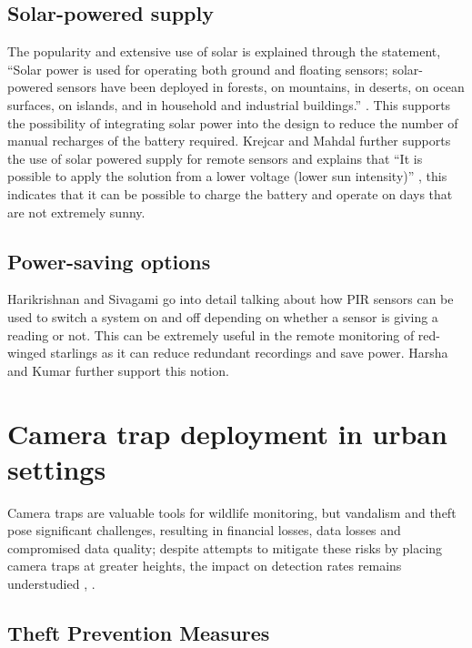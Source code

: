 \subsection{Solar-powered supply}

The popularity and extensive use of solar is explained through the statement, “Solar power is used for operating both ground and floating sensors; solar-powered sensors have been deployed in forests, on mountains, in deserts, on ocean surfaces, on islands, and in household and industrial buildings.” \cite{dewan2014alternative}. This supports the possibility of integrating solar power into the design to reduce the number of manual recharges of the battery required. Krejcar and Mahdal further supports the use of solar powered supply for remote sensors and explains that “It is possible to apply the solution from a lower voltage (lower sun intensity)” \cite{krejcar2012optimized}, this indicates that it can be possible to charge the battery and operate on days that are not extremely sunny.

\subsection{Power-saving options}


Harikrishnan and Sivagami \cite{harikirshnan2017intelligent} go into detail talking about how PIR sensors can be used to switch a system on and off depending on whether a sensor is giving a reading or not. This can be extremely useful in the remote monitoring of red-winged starlings as it can reduce redundant recordings and save power. Harsha and Kumar \cite{harsha2020home} further support this notion.


\section{Camera trap deployment in urban settings} 

Camera traps are valuable tools for wildlife monitoring, but vandalism and theft pose significant challenges, resulting in financial losses, data losses and compromised data quality; despite attempts to mitigate these risks by placing camera traps at greater heights, the impact on detection rates remains understudied \cite{meek2016higher}, \cite{meek2019camera}.


\subsection{Theft Prevention Measures} 

